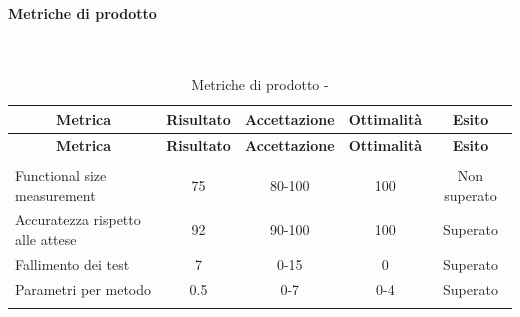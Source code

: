 \paragraph{Metriche di prodotto}\mbox{}\\
\begin{longtable}{|m{5cm}|c|c|c|c|}
	\hline \multicolumn{1}{|c|}{\textbf{Metrica}} & \multicolumn{1}{c|}{\textbf{Risultato}} & \multicolumn{1}{c|}{\textbf{Accettazione}} & \multicolumn{1}{c|}{\textbf{Ottimalità}} & \multicolumn{1}{c|}{\textbf{Esito}}\\
	\hline 
	\endfirsthead
	
	\hline \multicolumn{1}{|c|}{\textbf{Metrica}} & \multicolumn{1}{c|}{\textbf{Risultato}} & \multicolumn{1}{c|}{\textbf{Accettazione}} & \multicolumn{1}{c|}{\textbf{Ottimalità}} & \multicolumn{1}{c|}{\textbf{Esito}}\\
	\hline 
	\endhead
	
	\hline \multicolumn{5}{|r|}{\ToBeContinued} \\ 
	\hline
	\endfoot
	
	\endlastfoot
	
	\hline Functional size measurement & 75 & 80-100 & 100 & Non superato \\
	\hline Accuratezza rispetto alle attese & 92 & 90-100 & 100 & Superato \\
	\hline Fallimento dei test & 7 & 0-15 & 0 & Superato \\
	\hline Parametri per metodo & 0.5 & 0-7 & 0-4 & Superato \\
	\hline
	\caption{Metriche di prodotto - \RA{}}
\end{longtable}
